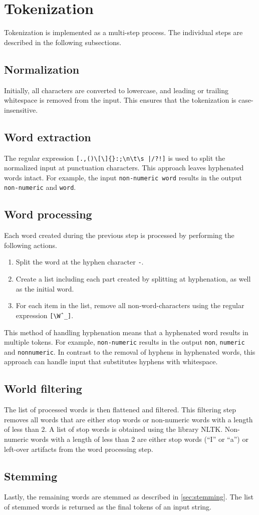 \section{Tokenization}
\label{sec:tokenization}

Tokenization is implemented as a multi-step process.
The individual steps are described in the following subsections.

\subsection{Normalization}
Initially, all characters are converted to lowercase, and leading or trailing whitespace is removed from the input.
This ensures that the tokenization is case-insensitive.

\subsection{Word extraction}
The regular expression \verb=[.,()\[\]{}:;\n\t\s |/?!]= is used to split the normalized input at punctuation characters.
This approach leaves hyphenated words intact.
For example, the input \verb|non-numeric word| results in the output \verb|non-numeric| and \verb|word|.

\subsection{Word processing}
Each word created during the previous step is processed by performing the following actions.

\begin{enumerate}
  \item Split the word at the hyphen character \verb|-|.
  \item Create a list including each part created by splitting at hyphenation, as well as the initial word.
  \item For each item in the list, remove all non-word-characters using the regular expression \verb|[\Wˆ_]|.
\end{enumerate}

This method of handling hyphenation means that a hyphenated word results in multiple tokens.
For example, \verb|non-numeric| results in the output \verb|non|, \verb|numeric| and \verb|nonnumeric|.
In contrast to the removal of hyphens in hyphenated words, this approach can handle input that substitutes hyphens with whitespace.

\subsection{World filtering}
The list of processed words is then flattened and filtered.
This filtering step removes all words that are either stop words or non-numeric words with a length of less than 2.
A list of stop words is obtained using the library NLTK.
Non-numeric words with a length of less than 2 are either stop words (\enquote{I} or \enquote{a}) or left-over artifacts from the word processing step.

\subsection{Stemming}
Lastly, the remaining words are stemmed as described in \cref{sec:stemming}.
The list of stemmed words is returned as the final tokens of an input string.
